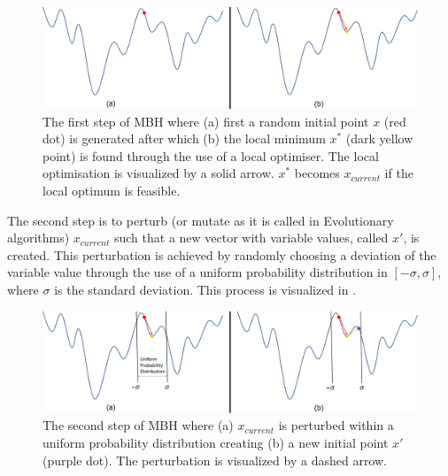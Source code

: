 

\begin{figure}[!ht]
\centering
\includegraphics[width=1.0\textwidth]{figures/optimisation/mbh_explained_1.png}
\caption{The first step of \ac{MBH} where (a) first a random initial point $x$ (red dot) is generated after which (b) the local minimum $x^{*}$ (dark yellow point) is found through the use of a local optimiser. The local optimisation is visualized by a solid arrow. $x^{*}$ becomes $x_{current}$ if the local optimum is feasible.}
\label{fig:mbh_explained_1}
\end{figure}

The second step is to perturb (or mutate as it is called in Evolutionary algorithms) $x_{current}$ such that a new vector with variable values, called $x'$, is created. This perturbation is achieved by randomly choosing a deviation of the variable value through the use of a uniform probability distribution in $\left[-\sigma, \sigma \right]$, where $\sigma$ is the standard deviation. This process is visualized in .


\begin{figure}[!ht]
\centering
\includegraphics[width=1.0\textwidth]{figures/optimisation/mbh_explained_2.png}
\caption{The second step of \ac{MBH} where (a) $x_{current}$ is perturbed within a uniform probability distribution creating (b) a new initial point $x'$ (purple dot). The perturbation is visualized by a dashed arrow.}
\label{fig:mbh_explained_2}
\end{figure}


